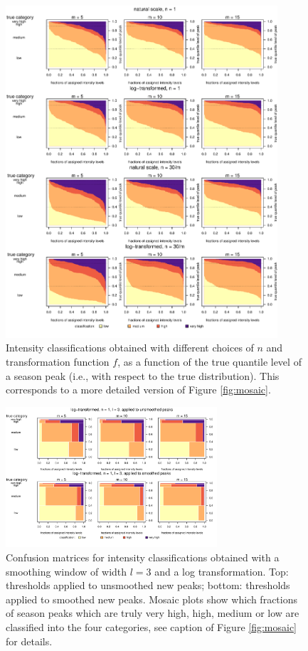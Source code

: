 \documentclass[12pt]{article}
\begin{document}
\begin{figure}[h!]
\includegraphics[width=0.9\textwidth]{figure/mosaic_fr_fancy.pdf}
\caption{Intensity classifications obtained with different choices of $n$ and transformation function $f$, as a function of the true quantile level of a season peak (i.e., with respect to the true distribution). This corresponds to a more detailed version of Figure \ref{fig:mosaic}.}
\label{fig:mosaic_fancy}
\end{figure}

\newpage


\begin{figure}[h!]
\begin{center}
\includegraphics[width=0.7\textwidth]{figure/mosaic_log_smoothed_fr.pdf}

\caption{Confusion matrices for intensity classifications obtained with a smoothing window of width $l = 3$ and a log transformation. Top: thresholds applied to unsmoothed new peaks; bottom: thresholds applied to smoothed new peaks. Mosaic plots show which fractions of season peaks which are truly very high, high, medium or low are classified into the four categories, see caption of Figure \ref{fig:mosaic} for details.}
\label{fig:mosaic_smoothing}
\end{center}
\end{figure}
\end{document}
